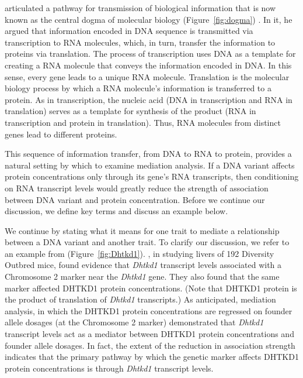 \documentclass[oneside]{book}\usepackage[]{graphicx}\usepackage[]{color}
\begin{document}
\citet{crick1958protein} articulated a pathway for transmission of biological information  
that is now known as the central dogma of molecular biology (Figure~\ref{fig:dogma}) 
\citep{crick1970central}. 
In it, he argued that information encoded in DNA sequence is transmitted via transcription 
to 
RNA molecules, which, in turn, transfer the information to proteins via translation. 
The process of transcription uses DNA as a template for creating a RNA molecule that 
conveys the information encoded in DNA. 
In this sense, every gene leads to a unique RNA molecule. 
Translation is the molecular biology process by which a RNA molecule's information is 
transferred to a protein. 
As in transcription, the nucleic acid (DNA in transcription and RNA in translation) serves 
as a template for synthesis of the product (RNA in transcription and protein in translation). 
Thus, RNA molecules from distinct genes lead to different proteins.

This sequence of information transfer, from DNA to RNA to protein, provides a natural 
setting by which to examine mediation analysis. If a DNA variant affects protein 
concentrations only through its gene's RNA transcripts, then conditioning on RNA transcript 
levels would greatly reduce the strength of association between DNA variant and protein 
concentration. Before we continue our discussion, we define key terms and discuss an 
example below. 

We continue by stating what it means for one trait to mediate a relationship between a 
DNA variant and another trait. To clarify our discussion, we refer to an example from 
\citet{chick2016defining} (Figure~\ref{fig:Dhtkd1}). \citet{chick2016defining}, in 
studying livers of 192 Diversity Outbred mice, found evidence that \emph{Dhtkd1} 
transcript levels associated with a Chromosome 2 marker near the \emph{Dhtkd1} gene. 
They also found that 
the same marker affected DHTKD1 protein concentrations. (Note that DHTKD1 protein is the 
product of translation of \emph{Dhtkd1} transcripts.)
As anticipated, mediation analysis, in which the DHTKD1 protein concentrations are
regressed on founder allele dosages (at the Chromosome 2 marker) demonstrated that
\emph{Dhtkd1} transcript levels act as a mediator between DHTKD1 protein concentrations 
and founder allele dosages. In fact, the extent of the reduction in association 
strength indicates that the primary pathway by which the genetic marker affects DHTKD1 
protein concentrations is through \emph{Dhtkd1} transcript levels.
\end{document}

